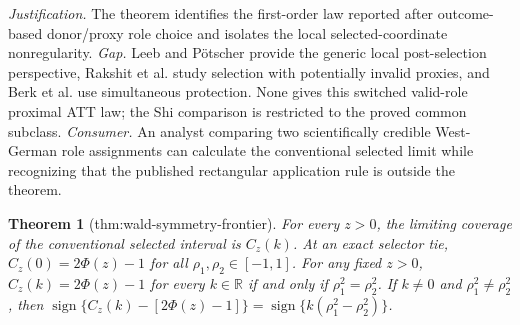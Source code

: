 \documentclass{article}
\newtheorem{theorem}{Theorem}
\begin{document}
\par\smallskip\noindent \textit{Justification.} The theorem identifies the first-order law reported after outcome-based donor/proxy role choice and isolates the local selected-coordinate nonregularity. \textit{Gap.} Leeb and Pötscher provide the generic local post-selection perspective, Rakshit et al. study selection with potentially invalid proxies, and Berk et al. use simultaneous protection. None gives this switched valid-role proximal ATT law; the Shi comparison is restricted to the proved common subclass. \textit{Consumer.} An analyst comparing two scientifically credible West-German role assignments can calculate the conventional selected limit while recognizing that the published rectangular application rule is outside the theorem.

\begin{theorem}[thm:wald-symmetry-frontier]\label{thm:wald-symmetry-frontier}
For every \(z>0\), the limiting coverage of the conventional selected interval is \(C_z(k)\). At an exact selector tie, \(C_z(0)=2\Phi(z)-1\) for all \(\rho_1,\rho_2\in[-1,1]\). For any fixed \(z>0\), \(C_z(k)=2\Phi(z)-1\) for every \(k\in\mathbb R\) if and only if \(\rho_1^2=\rho_2^2\). If \(k\neq0\) and \(\rho_1^2\neq\rho_2^2\), then \(\operatorname{sign}\{C_z(k)-[2\Phi(z)-1]\}=\operatorname{sign}\{k(\rho_1^2-\rho_2^2)\}\).
\end{theorem}
\end{document}
